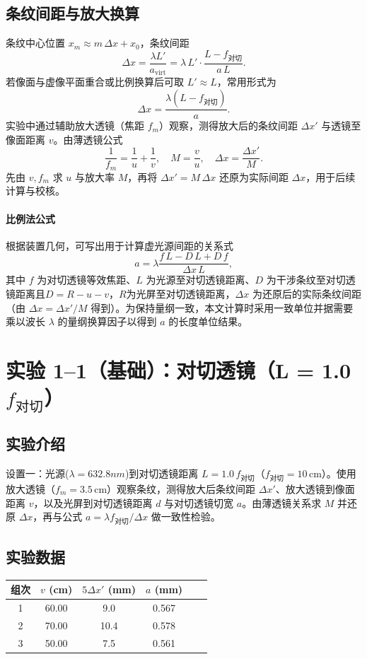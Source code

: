 \documentclass[12pt,a4paper]{article}
\begin{document}
\subsection*{条纹间距与放大换算}
条纹中心位置 $x_m \approx m\,\Delta x + x_0$，条纹间距
\[ \Delta x = \frac{\lambda L'}{a_{\text{virt}}} = \lambda\,L'\cdot\frac{L - f_{\text{对切}}}{a\,L}. \]
若像面与虚像平面重合或比例换算后可取 $L'\approx L$，常用形式为
\[ \Delta x = \frac{\lambda (L - f_{\text{对切}})}{a}. \]
实验中通过辅助放大透镜（焦距 $f_m$）观察，测得放大后的条纹间距 $\Delta x'$ 与透镜至像面距离 $v$。由薄透镜公式
\[ \frac{1}{f_m} = \frac{1}{u} + \frac{1}{v},\quad M = \frac{v}{u},\quad \Delta x = \frac{\Delta x'}{M}. \]
先由 $v,f_m$ 求 $u$ 与放大率 $M$，再将 $\Delta x'=M\,\Delta x$ 还原为实际间距 $\Delta x$，用于后续计算与校核。

\paragraph{比例法公式}
根据装置几何，可写出用于计算虚光源间距的关系式
\[
	a = \lambda  \frac{f\,L - D\,L + D\,f}{\Delta x\,L},
\]
其中 $f$ 为对切透镜等效焦距、$L$ 为光源至对切透镜距离、$D$ 为干涉条纹至对切透镜距离且$D=R-u-v$，$R$为光屏至对切透镜距离，$\Delta x$ 为还原后的实际条纹间距（由 $\Delta x=\Delta x'/M$ 得到）。为保持量纲一致，本文计算时采用一致单位并据需要乘以波长 $\lambda$ 的量纲换算因子以得到 $a$ 的长度单位结果。

\section{实验 1--1（基础）：对切透镜（L = 1.0\,$f_{\text{对切}}$）}
\subsection*{实验介绍}
设置一：光源($\lambda = 632.8 nm$)到对切透镜距离 $L=1.0\,f_{\text{对切}}$（$f_{\text{对切}}=10\,\mathrm{cm}$）。使用放大透镜（$f_m=3.5\,\mathrm{cm}$）观察条纹，测得放大后条纹间距 $\Delta x'$、放大透镜到像面距离 $v$，以及光屏到对切透镜距离 $d$ 与对切透镜切宽 $a$。由薄透镜关系求 $M$ 并还原 $\Delta x$，再与公式 $a = \lambda f_{\text{对切}}/\Delta x$ 做一致性检验。

\subsection*{实验数据}
\begin{center}
\begin{tabular}{cccccc}
\toprule
组次 & $v$ (cm) & $5\Delta x'$ (mm) & $a$ (mm) \\
\midrule
1 & 60.00 & 9.0 & 0.567 \\
2 & 70.00 & 10.4 & 0.578 \\
3 & 50.00 & 7.5 & 0.561 \\
\bottomrule
\end{tabular}
\end{center}
\end{document}
